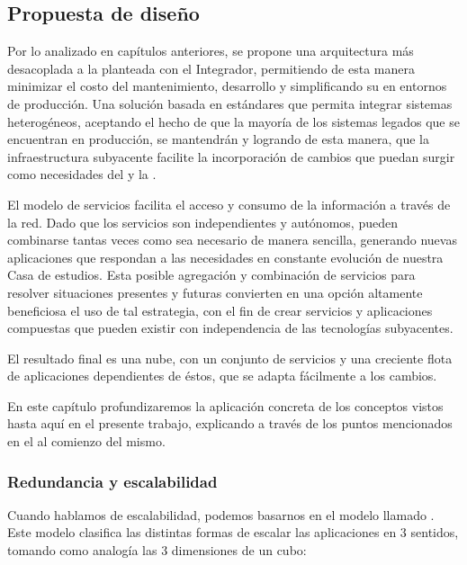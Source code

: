 \subsection{Propuesta de diseño}
\label{propuesta}

Por lo analizado en capítulos anteriores, se propone una arquitectura más desacoplada a la planteada con el Integrador, permitiendo de esta manera minimizar el costo del mantenimiento, desarrollo y simplificando su  en entornos de producción. Una solución basada en estándares que permita integrar sistemas heterogéneos, aceptando el hecho de que la mayoría de los sistemas legados que se encuentran en producción, se mantendrán y logrando de esta manera, que la infraestructura subyacente facilite la incorporación de cambios que puedan surgir como necesidades del {\cespi} y la {\unlp}.

El modelo de servicios facilita el acceso y consumo de la información a través de la red. Dado que los servicios son independientes y autónomos, pueden combinarse tantas veces como sea necesario de manera sencilla, generando nuevas aplicaciones que respondan a las necesidades en constante evolución de nuestra Casa de estudios. Esta posible agregación y combinación de servicios para resolver situaciones presentes y futuras convierten en una opción altamente beneficiosa el uso de tal estrategia, con el fin de crear servicios y aplicaciones compuestas que pueden existir con independencia de las tecnologías subyacentes\cite{microsoft2006}.

El resultado final es una nube, con un conjunto de servicios y una creciente flota de aplicaciones dependientes de éstos, que se adapta fácilmente a los cambios.

En este capítulo profundizaremos la aplicación concreta de los conceptos vistos hasta aquí en el presente trabajo, explicando a través de los puntos mencionados en el  al comienzo del mismo.


\subsubsection{Redundancia y escalabilidad}
\label{propuesta:escalabilidad}

Cuando hablamos de escalabilidad, podemos basarnos en el modelo llamado \cite{website:akfpartners-scale-cube}. Este modelo clasifica las distintas formas de escalar las aplicaciones en 3 sentidos, tomando como analogía las 3 dimensiones de un cubo:

